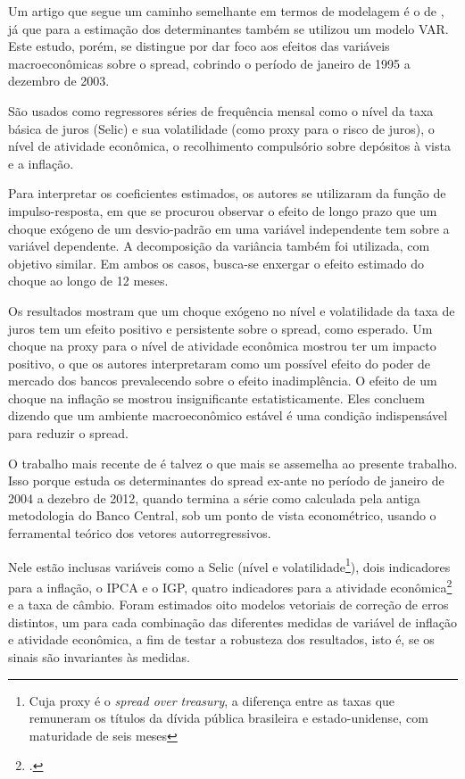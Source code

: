\documentclass[a4paper,
               article,
               12pt,
               openany,
               oneside,
               english,
               brazil]{abntex2}
\numberwithin{equation}{section}
\begin{document}
    Um artigo que segue um caminho semelhante em termos de modelagem é o de \textcite{oreiro}, já que para a estimação dos determinantes também se utilizou um modelo VAR\@. Este estudo, porém, se distingue por dar foco aos efeitos das variáveis macroeconômicas sobre o spread, cobrindo o período de janeiro de 1995 a dezembro de 2003. 
    
    São usados como regressores séries de frequência mensal como o nível da taxa básica de juros (Selic) e sua volatilidade (como proxy para o risco de juros), o nível de atividade econômica, o recolhimento compulsório sobre depósitos à vista e a inflação.

    Para interpretar os coeficientes estimados, os autores se utilizaram da função de impulso-resposta, em que se procurou observar o efeito de longo prazo que um choque exógeno de um desvio-padrão em uma variável independente tem sobre a variável dependente. A decomposição da variância também foi utilizada, com objetivo similar. Em ambos os casos, busca-se enxergar o efeito estimado do choque ao longo de 12 meses.

    Os resultados mostram que um choque exógeno no nível e volatilidade da taxa de juros tem um efeito positivo e persistente sobre o spread, como esperado. Um choque na proxy para o nível de atividade econômica mostrou ter um impacto positivo, o que os autores interpretaram como um possível efeito do poder de mercado dos bancos prevalecendo sobre o efeito inadimplência. O efeito de um choque na inflação se mostrou insignificante estatisticamente. Eles concluem dizendo que um ambiente macroeconômico estável é uma condição indispensável para reduzir o spread.

    O trabalho mais recente de \textcite{chaim} é talvez o que mais se assemelha ao presente trabalho. Isso porque estuda os determinantes do spread ex-ante no período de janeiro de 2004 a dezebro de 2012, quando termina a série como calculada pela antiga metodologia do Banco Central, sob um ponto de vista econométrico, usando o ferramental teórico dos vetores autorregressivos.

    Nele estão inclusas variáveis como a Selic (nível e volatilidade\footnote{Cuja proxy é o \textit{spread over treasury}, a diferença entre as taxas que remuneram os títulos da dívida pública brasileira e estado-unidense, com maturidade de seis meses}), dois indicadores para a inflação, o IPCA e o IGP, quatro indicadores para a atividade econômica\footcite[20]{chaim} e a taxa de câmbio. Foram estimados oito modelos vetoriais de correção de erros distintos, um para cada combinação das diferentes medidas de variável de inflação e atividade econômica, a fim de testar a robusteza dos resultados, isto é, se os sinais são invariantes às medidas. 
\end{document}
